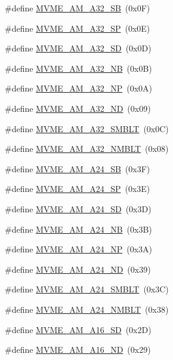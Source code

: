 \begin{DoxyCompactItemize}
\item 
\#define \hyperlink{group__mvmestdinclude_ga8e19f6f8b7c77ba0700df4c8b4980163}{MVME\_\-AM\_\-A32\_\-SB}~(0x0F)
\item 
\#define \hyperlink{group__mvmestdinclude_gab1a3c7875d40430fa853e67739c78371}{MVME\_\-AM\_\-A32\_\-SP}~(0x0E)
\item 
\#define \hyperlink{group__mvmestdinclude_gac37a7339f5a193bdf0265f49aedb4696}{MVME\_\-AM\_\-A32\_\-SD}~(0x0D)
\item 
\#define \hyperlink{group__mvmestdinclude_ga89dedae70a7277e2091f7a7f66d28a01}{MVME\_\-AM\_\-A32\_\-NB}~(0x0B)
\item 
\#define \hyperlink{group__mvmestdinclude_ga2ad16250f1ba34f2990d8a88e62beb24}{MVME\_\-AM\_\-A32\_\-NP}~(0x0A)
\item 
\#define \hyperlink{group__mvmestdinclude_gafc80e688bd7646b4e6a52a49ab42d9b9}{MVME\_\-AM\_\-A32\_\-ND}~(0x09)
\item 
\#define \hyperlink{group__mvmestdinclude_gac536941f770602aece8422c1116dc1bd}{MVME\_\-AM\_\-A32\_\-SMBLT}~(0x0C)
\item 
\#define \hyperlink{group__mvmestdinclude_ga4a2020bb04f39a29cca6e3dc07615664}{MVME\_\-AM\_\-A32\_\-NMBLT}~(0x08)
\item 
\#define \hyperlink{group__mvmestdinclude_gafb3974875e67dd56677d8827da813aed}{MVME\_\-AM\_\-A24\_\-SB}~(0x3F)
\item 
\#define \hyperlink{group__mvmestdinclude_ga086f24604509da1e2cedd0593b3deaab}{MVME\_\-AM\_\-A24\_\-SP}~(0x3E)
\item 
\#define \hyperlink{group__mvmestdinclude_ga660f4364bb3473787e104621504a102b}{MVME\_\-AM\_\-A24\_\-SD}~(0x3D)
\item 
\#define \hyperlink{group__mvmestdinclude_ga7df6e64988001896058d216dc3e375a1}{MVME\_\-AM\_\-A24\_\-NB}~(0x3B)
\item 
\#define \hyperlink{group__mvmestdinclude_ga330662e4b7f7f421c8c12c9ec63128e3}{MVME\_\-AM\_\-A24\_\-NP}~(0x3A)
\item 
\#define \hyperlink{group__mvmestdinclude_ga803ae58eabffb7258a6b07843c6c2523}{MVME\_\-AM\_\-A24\_\-ND}~(0x39)
\item 
\#define \hyperlink{group__mvmestdinclude_ga06bd96ee4af5c67cde69e923e50d463f}{MVME\_\-AM\_\-A24\_\-SMBLT}~(0x3C)
\item 
\#define \hyperlink{group__mvmestdinclude_ga7b46ba6108b0d9b5248318ca29e9df95}{MVME\_\-AM\_\-A24\_\-NMBLT}~(0x38)
\item 
\#define \hyperlink{group__mvmestdinclude_gaf0a01859770bb4849814cd77f2812908}{MVME\_\-AM\_\-A16\_\-SD}~(0x2D)
\item 
\#define \hyperlink{group__mvmestdinclude_gaac7d8e02b3139be0c6943e1d2f0a8361}{MVME\_\-AM\_\-A16\_\-ND}~(0x29)
\end{DoxyCompactItemize}


